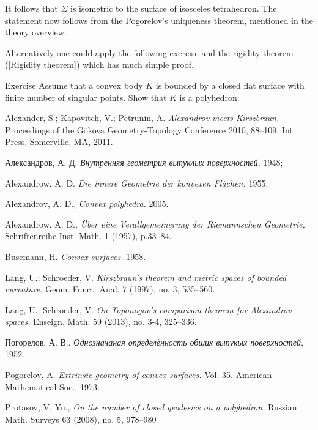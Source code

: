 \documentclass[oneside,a4paper, 12pt]{article}
\begin{document}
It follows that $\Sigma$ is isometric to the surface of isosceles tetrahedron.
The statement now follows from the Pogorelov's uniqueness theorem,
mentioned in the theory overview.

Alternatively one could apply the following exercise and the rigidity theorem (\ref{Rigidity theorem}) which has much simple proof.
\qeds

\begin{thm}{Exercise}
Assume that a convex body $K$ is bounded by a closed flat surface with finite number of singular points.
Show that $K$ is a polyhedron.
\end{thm}

\begin{thebibliography}{52}

 Alexander, S.; Kapovitch, V.; Petrunin, A. \emph{Alexandrov meets Kirszbraun.} Proceedings of the G\"okova Geometry-Topology Conference 2010, 88--109, Int. Press, Somerville, MA, 2011.

\begin{otherlanguage}{russian}
Александров, А. Д. 
\emph{Внутренняя геометрия выпуклых поверхностей.} 
1948;
\end{otherlanguage}
\begin{otherlanguage}{german}
Alexandrow, A. D. \emph{Die innere Geometrie der konvexen Fl\"achen.} 1955.
\end{otherlanguage}

Alexandrov, A. D.,
\emph{Convex polyhedra.} 2005.

 Alexandrow, A. D.,  \textit{\"Uber eine Verallgemeinerung der Riemannschen Geometrie,}
Schriftenreihe Inst. Math. 1 (1957), p.33--84.

 Busemann, H.
\emph{Convex surfaces.} 1958.

 Lang, U.; Schroeder, V. \emph{Kirszbraun's theorem and metric spaces of bounded curvature.} Geom. Funct. Anal. 7 (1997), no. 3, 535--560.

 Lang, U.; Schroeder, V. \emph{On Toponogov's comparison theorem for Alexandrov spaces.} Enseign. Math. 59 (2013), no. 3-4, 325--336.

\begin{otherlanguage}{russian}
Погорелов, А. В.,
\emph{Однозначаная определённость общих выпукых поверхностей},
1952.
\end{otherlanguage}

Pogorelov, A. \emph{Extrinsic geometry of convex surfaces.} Vol. 35. American Mathematical Soc., 1973.

 Protasov, V. Yu.,
\emph{On the number of closed geodesics on a polyhedron.}  Russian Math. Surveys 63 (2008), no. 5, 978--980
\end{thebibliography}
\end{document}

